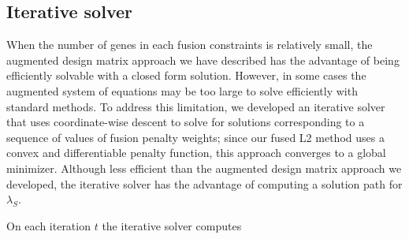 \documentclass[11pt]{article}
\begin{document}

\subsection{Iterative solver}

When the number of genes in each fusion constraints is relatively small, the augmented design matrix approach we have described has the advantage of being efficiently solvable with a closed form solution. However, in some cases the augmented system of equations may be too large to solve efficiently with standard methods. To address this limitation, we developed an iterative solver that uses coordinate-wise descent to solve for solutions corresponding to a sequence of values of fusion penalty weights; since our fused L2 method uses a convex and differentiable penalty function, this approach converges to a global minimizer. Although less efficient than the augmented design matrix approach we developed, the iterative solver has the advantage of computing a solution path for $\lambda_S$.

On each iteration $t$ the iterative solver computes
\end{document}
